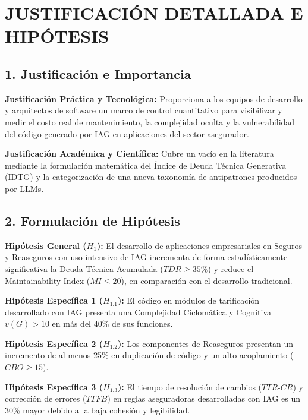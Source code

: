 \chapter*{JUSTIFICACIÓN DETALLADA E HIPÓTESIS}

\section*{1. Justificación e Importancia}

\textbf{Justificación Práctica y Tecnológica:} Proporciona a los equipos de
desarrollo y arquitectos de software un marco de control cuantitativo para
visibilizar y medir el costo real de mantenimiento, la complejidad oculta y
la vulnerabilidad del código generado por IAG en aplicaciones del sector
asegurador.

\textbf{Justificación Académica y Científica:} Cubre un vacío en la
literatura mediante la formulación matemática del Índice de Deuda Técnica
Generativa (IDTG) y la categorización de una nueva taxonomía de antipatrones
producidos por LLMs.

\section*{2. Formulación de Hipótesis}

\textbf{Hipótesis General ($H_1$):} El desarrollo de aplicaciones
empresariales en Seguros y Reaseguros con uso intensivo de IAG incrementa de
forma estadísticamente significativa la Deuda Técnica Acumulada
($TDR \ge 35\%$) y reduce el Maintainability Index ($MI \le 20$), en
comparación con el desarrollo tradicional.

\textbf{Hipótesis Específica 1 ($H_{1.1}$):} El código en módulos de
tarificación desarrollado con IAG presenta una Complejidad Ciclomática y
Cognitiva $v(G) > 10$ en más del 40\% de sus funciones.

\textbf{Hipótesis Específica 2 ($H_{1.2}$):} Los componentes de Reaseguros
presentan un incremento de al menos 25\% en duplicación de código y un alto
acoplamiento ($CBO \ge 15$).

\textbf{Hipótesis Específica 3 ($H_{1.3}$):} El tiempo de resolución de
cambios ($TTR\text{-}CR$) y corrección de errores ($TTFB$) en reglas
aseguradoras desarrolladas con IAG es un 30\% mayor debido a la baja cohesión
y legibilidad.
